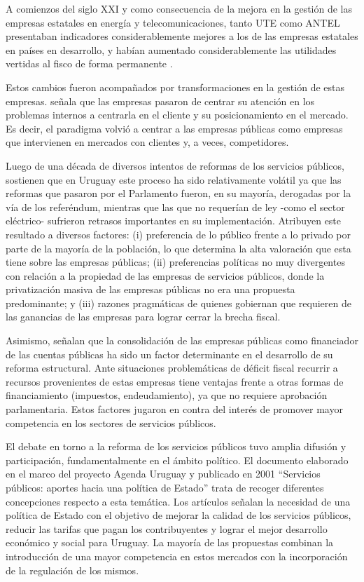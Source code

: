 \documentclass[
  12pt,
  spanish,
]{book}
\begin{document}
A comienzos del siglo XXI y como consecuencia de la mejora en la gestión de las empresas estatales en energía y telecomunicaciones, tanto UTE como ANTEL presentaban indicadores considerablemente mejores a los de las empresas estatales en países en desarrollo, y habían aumentado considerablemente las utilidades vertidas al fisco de forma permanente \citep{Bergara2005}.

Estos cambios fueron acompañados por transformaciones en la gestión de estas empresas. \citet{Oria2008} señala que las empresas pasaron de centrar su atención en los problemas internos a centrarla en el cliente y su posicionamiento en el mercado. Es decir, el paradigma volvió a centrar a las empresas públicas como empresas que intervienen en mercados con clientes y, a veces, competidores.

Luego de una década de diversos intentos de reformas de los servicios públicos, \citet{Bergara2005} sostienen que en Uruguay este proceso ha sido relativamente volátil ya que las reformas que pasaron por el Parlamento fueron, en su mayoría, derogadas por la vía de los referéndum, mientras que las que no requerían de ley -como el sector eléctrico- sufrieron retrasos importantes en su implementación. Atribuyen este resultado a diversos factores: (i) preferencia de lo público frente a lo privado por parte de la mayoría de la población, lo que determina la alta valoración que esta tiene sobre las empresas públicas; (ii) preferencias políticas no muy divergentes con relación a la propiedad de las empresas de servicios públicos, donde la privatización masiva de las empresas públicas no era una propuesta predominante; y (iii) razones pragmáticas de quienes gobiernan que requieren de las ganancias de las empresas para lograr cerrar la brecha fiscal.

Asimismo, señalan que la consolidación de las empresas públicas como financiador de las cuentas públicas ha sido un factor determinante en el desarrollo de su reforma estructural. Ante situaciones problemáticas de déficit fiscal recurrir a recursos provenientes de estas empresas tiene ventajas frente a otras formas de financiamiento (impuestos, endeudamiento), ya que no requiere aprobación parlamentaria. Estos factores jugaron en contra del interés de promover mayor competencia en los sectores de servicios públicos.

El debate en torno a la reforma de los servicios públicos tuvo amplia difusión y participación, fundamentalmente en el ámbito político. El documento elaborado en el marco del proyecto Agenda Uruguay y publicado en 2001 ``Servicios públicos: aportes hacia una política de Estado'' \citep{CIIIPUPAZ2001} trata de recoger diferentes concepciones respecto a esta temática. Los artículos señalan la necesidad de una política de Estado con el objetivo de mejorar la calidad de los servicios públicos, reducir las tarifas que pagan los contribuyentes y lograr el mejor desarrollo económico y social para Uruguay. La mayoría de las propuestas combinan la introducción de una mayor competencia en estos mercados con la incorporación de la regulación de los mismos.
\end{document}
